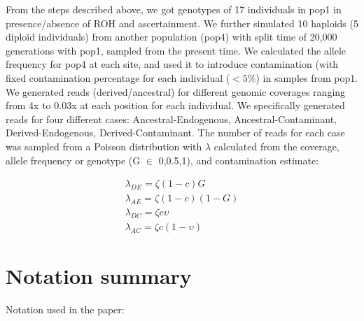 \documentclass[12pt, letterpaper]{article}
\begin{document}
From the steps described above, we got genotypes of 17 individuals in pop1 in presence/absence of ROH and ascertainment. We further simulated 10 haploids (5 diploid individuals) from another population (pop4) with split time of 20,000 generations with pop1, sampled from the present time. We calculated the allele frequency for pop4 at each site, and used it to introduce contamination (with fixed contamination percentage for each individual ($<5\%$) in samples from pop1. We generated reads (derived/ancestral) for different genomic coverages ranging from 4x to 0.03x at each position for each individual. We specifically generated reads for four different cases: Ancestral-Endogenous, Ancestral-Contaminant, Derived-Endogenous, Derived-Contaminant. The number of reads for each case was sampled from a Poisson distribution with $\lambda$ calculated from the coverage, allele frequency or genotype (G $\in$ 0,0.5,1), and contamination estimate:

\begin{align}
    \lambda_{DE} = \zeta (1-c) G\nonumber\\
    \lambda_{AE} = \zeta (1-c) (1-G)\nonumber\\
    \lambda_{DC} = \zeta c \upsilon\nonumber\\
    \lambda_{AC} = \zeta c (1-\upsilon)
\end{align}


\section{Notation summary}
Notation used in the paper:
\end{document}
